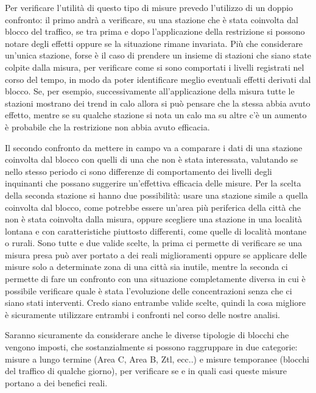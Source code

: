 \documentclass{article}
\begin{document}
Per verificare l'utilità di questo tipo di misure prevedo l'utilizzo di un doppio confronto: il primo andrà a verificare, su una stazione che è stata coinvolta dal blocco del traffico, se tra prima e dopo l'applicazione della restrizione si possono notare degli effetti oppure se la situazione rimane invariata.
Più che considerare un'unica stazione, forse è il caso di prendere un insieme di stazioni che siano state colpite dalla misura, per verificare come si sono comportati i livelli registrati nel corso del tempo, in modo da poter identificare meglio eventuali effetti derivati dal blocco. Se, per esempio, successivamente all'applicazione della misura tutte le stazioni mostrano dei trend in calo allora si può pensare che la stessa abbia avuto effetto, mentre se su qualche stazione si nota un calo ma su altre c'è un aumento è probabile che la restrizione non abbia avuto efficacia.

Il secondo confronto da mettere in campo va a comparare i dati di una stazione coinvolta dal blocco con quelli di una che non è stata interessata, valutando se nello stesso periodo ci sono differenze di comportamento dei livelli degli inquinanti che possano suggerire un'effettiva efficacia delle misure.
Per la scelta della seconda stazione si hanno due possibilità: usare una stazione simile a quella coinvolta dal blocco, come potrebbe essere un'area più periferica della città che non è stata coinvolta dalla misura, oppure scegliere una stazione in una località lontana e con caratteristiche piuttosto differenti, come quelle di località montane o rurali. Sono tutte e due valide scelte, la prima ci permette di verificare se una misura presa può aver portato a dei reali miglioramenti oppure se applicare delle misure solo a determinate zona di una città sia inutile, mentre la seconda ci permette di fare un confronto con una situazione completamente diversa in cui è possibile verificare quale è stata l'evoluzione delle concentrazioni senza che ci siano stati interventi. Credo siano entrambe valide scelte, quindi la cosa migliore è sicuramente utilizzare entrambi i confronti nel corso delle nostre analisi.

Saranno sicuramente da considerare anche le diverse tipologie di blocchi che vengono imposti, che sostanzialmente si possono raggruppare in due categorie: misure a lungo termine (Area C, Area B, Ztl, ecc..) e misure temporanee (blocchi del traffico di qualche giorno), per verificare se e in quali casi queste misure portano a dei benefici reali. 
\end{document}
